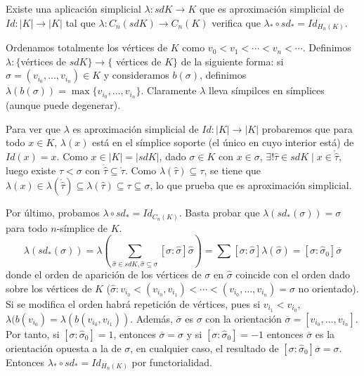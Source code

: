 \documentclass[HS.tex]{subfiles}
\begin{document}
\begin{teorema}
Existe una aplicación simplicial $\lambda: sdK\to K$ que es aproximación simplicial de $Id:|K|\to |K|$ tal que $\lambda:C_n(sdK)\to C_n(K)$ verifica que $\lambda_*\circ sd_*=Id_{H_n(K)}$.
\end{teorema}
\begin{dem}
Ordenamos totalmente los vértices de $K$ como $v_0<v_1<\cdots<v_n<\cdots$. Definimos $\lambda:\{$vértices de $sdK\}\to\{$ vértices de $K\}$ de la siguiente forma: si $\sigma=(v_{i_0}, \dots, v_{i_n})\in K$ y consideramos $b(\sigma)$, definimos $\lambda(b(\sigma))=\max\{v_{i_0},\dots, v_{i_n}\}$. Claramente $\lambda$ lleva símpilces en símplices (aunque puede degenerar). 

Para ver que $\lambda$ es aproximación simplicial de $Id:|K|\to|K|$ probaremos que para todo $x\in K$, $\lambda(x)$ está en el símplice soporte (el único en cuyo interior está) de $Id(x)=x$. Como $x\in |K|=|sdK|$, dado $\sigma\in K$ con $x\in\sigma$, $\exists!\hat{\tau}\in sdK\mid x\in\mathring{\hat{\tau}}$, luego existe $\tau<\sigma$ con $\mathring{\hat{\tau}}\subseteq\mathring{\tau}$. Como $\lambda(\hat{\tau})\subseteq\tau$, se tiene que $\lambda(x)\in\lambda(\mathring{\hat{\tau}})\subseteq\lambda(\hat{\tau})\subseteq\tau\subseteq\sigma$, lo que prueba que es aproximación simplicial.

Por último, probamos $\lambda\circ sd_*=Id_{C_n(K)}$. Basta probar que $\lambda(sd_*(\sigma))=\sigma$ para todo $n$-símplice de $K$. 
\[
\lambda(sd_*(\sigma))=\lambda\left(\sum_{\hat{\sigma}\in sdK, \hat{\sigma}\subseteq\sigma}[\sigma:\hat{\sigma}]\hat{\sigma}\right)=\sum[\sigma:\hat{\sigma}]\lambda(\hat{\sigma})=[\sigma:\hat{\sigma}_0]\overline{\sigma}
\]
donde el orden de aparición de los vértices de $\sigma$ en $\hat{\sigma}$ coincide con el orden dado sobre los vértices de $K$ ($\hat{\sigma}: v_{i_0}<(v_{i_0},v_{i_1})<\cdots< (v_{i_0},\dots, v_{i_n})=\sigma$ no orientado). Si se modifica el orden habrá repetición de vértices, pues si $v_{i_1}<v_{i_0}$, $\lambda(b(v_{i_0})=\lambda(b(v_{i_0},v_{i_1}))$. Además, $\overline{\sigma}$ es $\sigma$ con la orientación $\overline{\sigma}=[v_{i_0},\dots, v_{i_n}]$. Por tanto, si $[\sigma:\hat{\sigma}_0]=1$, entonces $\overline{\sigma}=\sigma$ y si  $[\sigma:\hat{\sigma}_0]=-1$ entonces $\overline{\sigma}$ es la orientación opuesta a la de $\sigma$, en cualquier caso, el resultado de $[\sigma:\hat{\sigma}_0]\overline{\sigma}=\sigma$. Entonces $\lambda_*\circ sd_*=Id_{H_n(K)}$ por functorialidad. 

\QED
\end{dem}
\end{document}
